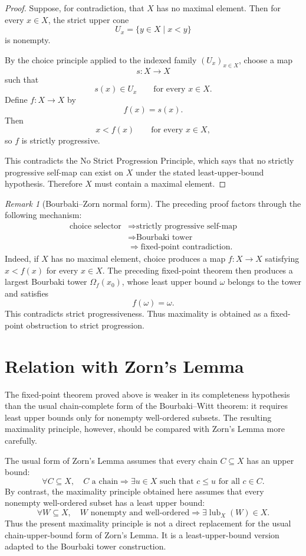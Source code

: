 \documentclass[11pt]{article}
\theoremstyle{definition}
\theoremstyle{remark}
\newtheorem{remark}[theorem]{Remark}
\newcommand{\lub}{\operatorname{lub}}
\begin{document}
\begin{proof}
Suppose, for contradiction, that \(X\) has no maximal element. Then for every \(x\in X\),
the strict upper cone
\[
U_x=\{y\in X\mid x<y\}
\]
is nonempty.

By the choice principle applied to the indexed family \((U_x)_{x\in X}\), choose a map
\[
s:X\to X
\]
such that
\[
s(x)\in U_x
\qquad\text{for every }x\in X.
\]
Define \(f:X\to X\) by
\[
f(x)=s(x).
\]
Then
\[
x<f(x)
\qquad\text{for every }x\in X,
\]
so \(f\) is strictly progressive.

This contradicts the No Strict Progression Principle, which says that no strictly
progressive self-map can exist on \(X\) under the stated least-upper-bound hypothesis.
Therefore \(X\) must contain a maximal element.
\end{proof}

\begin{remark}[Bourbaki--Zorn normal form]
The preceding proof factors through the following mechanism:
\[
\begin{aligned}
\text{choice selector}
&\Longrightarrow
\text{strictly progressive self-map} \\
&\Longrightarrow
\text{Bourbaki tower} \\
&\Longrightarrow
\text{fixed-point contradiction}.
\end{aligned}
\]
Indeed, if \(X\) has no maximal element, choice produces a map \(f:X\to X\) satisfying
\(x<f(x)\) for every \(x\in X\). The preceding fixed-point theorem then produces a
largest Bourbaki tower \(\Omega_f(x_0)\), whose least upper bound \(\omega\) belongs to
the tower and satisfies
\[
f(\omega)=\omega.
\]
This contradicts strict progressiveness. Thus maximality is obtained as a fixed-point
obstruction to strict progression.
\end{remark}

\section{Relation with Zorn's Lemma}

The fixed-point theorem proved above is weaker in its completeness hypothesis than the
usual chain-complete form of the Bourbaki--Witt theorem: it requires least upper bounds
only for nonempty well-ordered subsets. The resulting maximality principle, however,
should be compared with Zorn's Lemma more carefully.

The usual form of Zorn's Lemma assumes that every chain \(C\subseteq X\) has an upper
bound:
\[
\forall C\subseteq X,\quad
C\text{ a chain}
\Longrightarrow
\exists u\in X\text{ such that }c\leq u\text{ for all }c\in C.
\]
By contrast, the maximality principle obtained here assumes that every nonempty
well-ordered subset has a least upper bound:
\[
\forall W\subseteq X,\quad
W\text{ nonempty and well-ordered}
\Longrightarrow
\exists \lub_X(W)\in X.
\]
Thus the present maximality principle is not a direct replacement for the usual
chain-upper-bound form of Zorn's Lemma. It is a least-upper-bound version adapted to the
Bourbaki tower construction.
\end{document}
